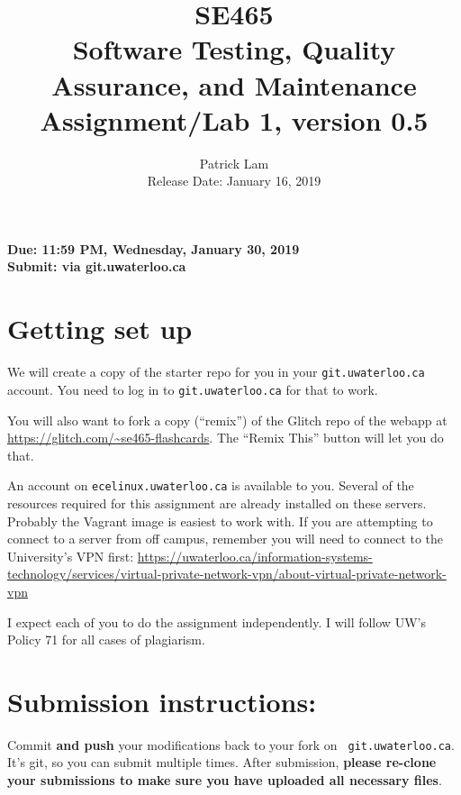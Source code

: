 \documentclass[10pt,hidelinks]{article}
\begin{document}
\title{
SE465 \\
Software Testing, Quality Assurance, and Maintenance\\
Assignment/Lab 1, version 0.5}
\author{Patrick Lam \\
{Release Date:  January 16, 2019} \\
}
\renewcommand{\today}{}
\maketitle

\begin{center}

{\bf Due:  11:59 PM, Wednesday, January 30, 2019} \\
{\bf Submit: via git.uwaterloo.ca }\\
\end{center}

\section*{Getting set up}
We will create a copy of the starter repo for you in your {\tt git.uwaterloo.ca} account. You need to log in to {\tt git.uwaterloo.ca} for that to work.

You will also want to fork a copy (``remix'') of the Glitch repo of the webapp at
\url{https://glitch.com/~se465-flashcards}. The ``Remix This'' button will let you do that.

An account on {\tt ecelinux.uwaterloo.ca} is available to you.
Several of the resources required for this assignment are already installed on these servers. Probably the Vagrant image is easiest to work with.
If you are attempting to connect to a server from off campus, remember you will need to connect to the University's VPN first: \url{https://uwaterloo.ca/information-systems-technology/services/virtual-private-network-vpn/about-virtual-private-network-vpn}

I expect each of you to do the assignment independently. I will follow UW's Policy 71 for all cases of plagiarism.
 
\newpage
 \section*{Submission instructions:} 
Commit {\bf and push} your modifications back to your fork on {\tt
  git.uwaterloo.ca}.  It's git, so you can submit multiple times. After
submission, {\bf please re-clone your submissions to make sure you
  have uploaded all necessary files}.
 
\end{document}
